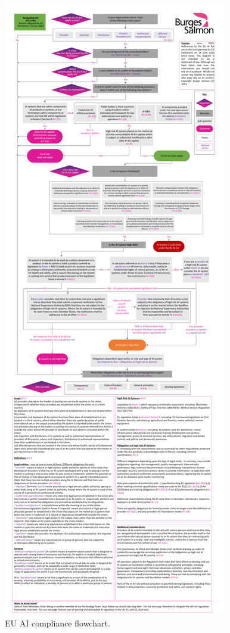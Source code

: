 \begin{figure}[htbp]
    \centering
    \includegraphics{euaiflowchart}
    \caption{EU AI compliance flowchart.}
    \label{fig:euAIcompliance}
\end{figure}

